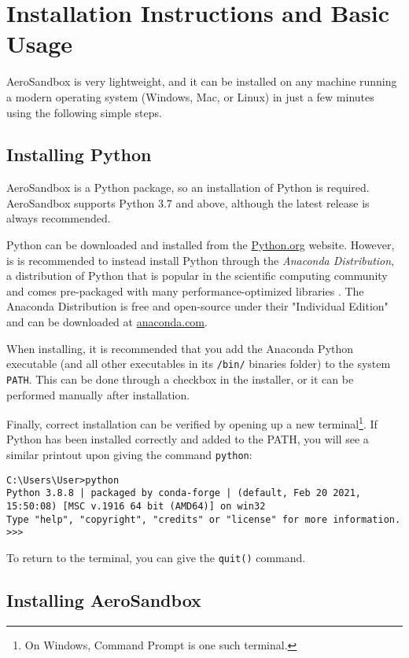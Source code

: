 \chapter{Installation Instructions and Basic Usage}
\label{chapter:installation}

AeroSandbox is very lightweight, and it can be installed on any machine running a modern operating system (Windows, Mac, or Linux) in just a few minutes using the following simple steps.


\section{Installing Python}

AeroSandbox is a Python package, so an installation of Python is required. AeroSandbox supports Python 3.7 and above, although the latest release is always recommended.

Python can be downloaded and installed from the \url{Python.org} website. However, is is recommended to instead install Python through the \textit{Anaconda Distribution}, a distribution of Python that is popular in the scientific computing community and comes pre-packaged with many performance-optimized libraries \cite{anaconda}. The Anaconda Distribution is free and open-source under their "Individual Edition" and can be downloaded at \url{anaconda.com}.

When installing, it is recommended that you add the Anaconda Python executable (and all other executables in its \texttt{/bin/} binaries folder) to the system \texttt{PATH}. This can be done through a checkbox in the installer, or it can be performed manually after installation.

Finally, correct installation can be verified by opening up a new terminal\footnote{On Windows, Command Prompt is one such terminal.}. If Python has been installed correctly and added to the PATH, you will see a similar printout upon giving the command \texttt{python}:

\begin{verbatim}
C:\Users\User>python
Python 3.8.8 | packaged by conda-forge | (default, Feb 20 2021, 15:50:08) [MSC v.1916 64 bit (AMD64)] on win32
Type "help", "copyright", "credits" or "license" for more information.
>>>
\end{verbatim}

To return to the terminal, you can give the \texttt{quit()} command.


\section{Installing AeroSandbox}

